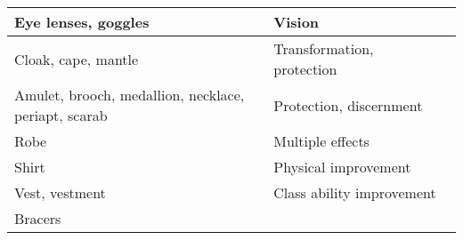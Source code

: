\begin{longtable}{llll}
{\begin{minipage}[t]{1.700in}
Eye lenses, goggles\end{minipage}} & \multicolumn{3}{p{2.395in}|}{\begin{minipage}[t]{2.395in}\raggedright
Vision\end{minipage}}\\
\hline
\multicolumn{1}{p{0.069in}|}{\begin{minipage}[t]{0.069in}\raggedright
Cloak, cape, mantle\end{minipage}} & \multicolumn{1}{p{0.069in}|}{\begin{minipage}[t]{0.069in}\raggedright
Transformation, protection\end{minipage}}\\
\hline
\multicolumn{1}{|p{1.700in}|}{\begin{minipage}[t]{1.700in}\raggedright
Amulet, brooch, medallion, necklace, periapt, scarab\end{minipage}} & \multicolumn{3}{p{2.395in}|}{\begin{minipage}[t]{2.395in}\raggedright
Protection, discernment\end{minipage}}\\
\hline
\multicolumn{1}{|p{1.700in}|}{\begin{minipage}[t]{1.700in}\raggedright
Robe \end{minipage}} & \multicolumn{3}{p{2.395in}|}{\begin{minipage}[t]{2.395in}\raggedright
Multiple effects\end{minipage}}\\
\hline
\multicolumn{1}{|p{1.700in}|}{\begin{minipage}[t]{1.700in}\raggedright
Shirt \end{minipage}} & \multicolumn{3}{p{2.395in}|}{\begin{minipage}[t]{2.395in}\raggedright
Physical improvement\end{minipage}}\\
\hline
\multicolumn{1}{|p{1.700in}|}{\begin{minipage}[t]{1.700in}\raggedright
Vest, vestment \end{minipage}} & \multicolumn{3}{p{2.395in}|}{\begin{minipage}[t]{2.395in}\raggedright
Class ability improvement\end{minipage}}\\
\hline
\multicolumn{1}{|p{1.700in}|}{\begin{minipage}[t]{1.700in}\raggedright
Bracers \end{minipage}} & \multicolumn{3}{p{2.395in}|}{\begin{minipage}[t]{2.395in}\raggedright

\end{minipage}}
\end{longtable}
